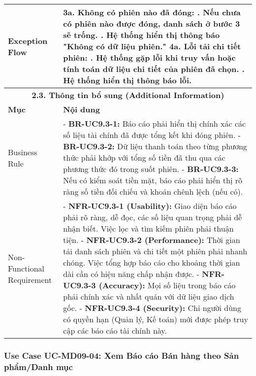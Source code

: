 \begin{longtable}{|m{4cm}|p{11cm}|}
\hline
Exception Flow & \textbf{3a. Không có phiên nào đã đóng:} \newline    1. Nếu chưa có phiên nào được đóng, danh sách ở bước 3 sẽ trống. \newline    2. Hệ thống hiển thị thông báo "Không có dữ liệu phiên." \newline \textbf{4a. Lỗi tải chi tiết phiên:} \newline    1. Hệ thống gặp lỗi khi truy vấn hoặc tính toán dữ liệu chi tiết của phiên đã chọn. \newline    2. Hệ thống hiển thị thông báo lỗi. \\
\hline
\multicolumn{2}{|c|}{\textbf{2.3. Thông tin bổ sung (Additional Information)}} \\
\hline
\textbf{Mục} & \textbf{Nội dung} \\
\hline
Business Rule & - \textbf{BR-UC9.3-1:} Báo cáo phải hiển thị chính xác các số liệu tài chính đã được tổng kết khi đóng phiên. \newline - \textbf{BR-UC9.3-2:} Dữ liệu thanh toán theo từng phương thức phải khớp với tổng số tiền đã thu qua các phương thức đó trong suốt phiên. \newline - \textbf{BR-UC9.3-3:} Nếu có kiểm soát tiền mặt, báo cáo phải hiển thị rõ ràng số tiền đối chiếu và khoản chênh lệch (nếu có). \\
\hline
Non-Functional Requirement & - \textbf{NFR-UC9.3-1 (Usability):} Giao diện báo cáo phải rõ ràng, dễ đọc, các số liệu quan trọng phải dễ nhận biết. Việc lọc và tìm kiếm phiên phải thuận tiện. \newline - \textbf{NFR-UC9.3-2 (Performance):} Thời gian tải danh sách phiên và chi tiết một phiên phải nhanh chóng. Việc tổng hợp báo cáo cho khoảng thời gian dài cần có hiệu năng chấp nhận được. \newline - \textbf{NFR-UC9.3-3 (Accuracy):} Mọi số liệu trong báo cáo phải chính xác và nhất quán với dữ liệu giao dịch gốc. \newline - \textbf{NFR-UC9.3-4 (Security):} Chỉ người dùng có quyền hạn (Quản lý, Kế toán) mới được phép truy cập các báo cáo tài chính này. \\
\hline
\end{longtable}

\subsubsection{Use Case UC-MD09-04: Xem Báo cáo Bán hàng theo Sản phẩm/Danh mục}

